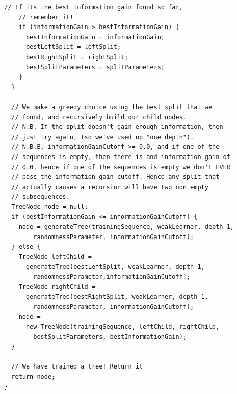 \documentclass[12pt,twoside,notitlepage]{report}
\begin{document}
\begin{lstlisting}[caption={The implementation code for tree generation.}, label={lst:actualGenerateTree}]
    // If its the best information gain found so far, 
    // remember it!
    if (informationGain > bestInformationGain) {
      bestInformationGain = informationGain;
      bestLeftSplit = leftSplit;
      bestRightSplit = rightSplit;
      bestSplitParameters = splitParameters;
    }
  }
  
  // We make a greedy choice using the best split that we 
  // found, and recursively build our child nodes.
  // N.B. If the split doesn't gain enough information, then 
  // just try again, (so we've used up "one depth").
  // N.B.B. informationGainCutoff >= 0.0, and if one of the 
  // sequences is empty, then there is and information gain of 
  // 0.0, hence if one of the sequences is empty we don't EVER 
  // pass the information gain cutoff. Hence any split that 
  // actually causes a recursion will have two non empty 
  // subsequences.
  TreeNode node = null;
  if (bestInformationGain <= informationGainCutoff) {
    node = generateTree(trainingSequence, weakLearner, depth-1, 
        randomnessParameter, informationGainCutoff);
  } else {
    TreeNode leftChild = 
      generateTree(bestLeftSplit, weakLearner, depth-1, 
        randomnessParameter,informationGainCutoff);
    TreeNode rightChild = 
      generateTree(bestRightSplit, weakLearner, depth-1, 
        randomnessParameter, informationGainCutoff);
    node = 
      new TreeNode(trainingSequence, leftChild, rightChild, 
        bestSplitParameters, bestInformationGain);
  }
  
  // We have trained a tree! Return it
  return node;
}
    \end{lstlisting}
\end{document}
